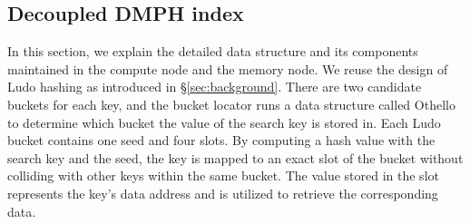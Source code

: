 \subsection{Decoupled DMPH index}
\label{sec:design:table}
In this section, we explain the detailed data structure and its components maintained in the compute node and the memory node. 
We reuse the design of Ludo hashing as introduced in \S\ref{sec:background}. There are two candidate buckets for each key, and the bucket locator runs 
a data structure called Othello~\cite{othello} to determine which bucket the value of the search key is stored in. 
Each Ludo bucket contains one seed and four slots. By computing a hash value with the search key and the seed, the key is mapped to an exact slot of the bucket without colliding with other keys within the same bucket. The value stored in the slot represents the key's data address and is utilized to retrieve the corresponding data.

